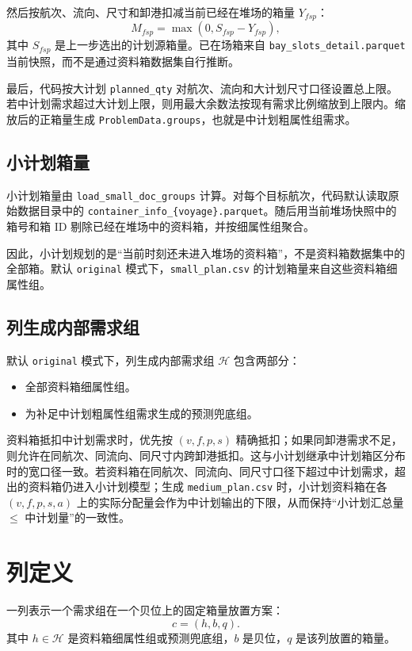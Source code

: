 \documentclass[UTF8,a4paper,11pt]{ctexart}
\newcommand{\code}[1]{\nolinkurl{#1}}
\begin{document}
然后按航次、流向、尺寸和卸港扣减当前已经在堆场的箱量 \(Y_{fsp}\)：
\[
M_{fsp}=\max(0, S_{fsp}-Y_{fsp}),
\]
其中 \(S_{fsp}\) 是上一步选出的计划源箱量。已在场箱来自 \code{bay_slots_detail.parquet} 当前快照，而不是通过资料箱数据集自行推断。

最后，代码按大计划 \code{planned_qty} 对航次、流向和大计划尺寸口径设置总上限。若中计划需求超过大计划上限，则用最大余数法按现有需求比例缩放到上限内。缩放后的正箱量生成 \code{ProblemData.groups}，也就是中计划粗属性组需求。

\subsection{小计划箱量}

小计划箱量由 \code{load_small_doc_groups} 计算。对每个目标航次，代码默认读取原始数据目录中的 \code{container_info_\{voyage\}.parquet}。随后用当前堆场快照中的箱号和箱 ID 剔除已经在堆场中的资料箱，并按细属性组聚合。

因此，小计划规划的是“当前时刻还未进入堆场的资料箱”，不是资料箱数据集中的全部箱。默认 \code{original} 模式下，\code{small_plan.csv} 的计划箱量来自这些资料箱细属性组。

\subsection{列生成内部需求组}

默认 \code{original} 模式下，列生成内部需求组 \(\mathcal{H}\) 包含两部分：
\begin{itemize}
  \item 全部资料箱细属性组。
  \item 为补足中计划粗属性组需求生成的预测兜底组。
\end{itemize}

资料箱抵扣中计划需求时，优先按 \((v,f,p,s)\) 精确抵扣；如果同卸港需求不足，则允许在同航次、同流向、同尺寸内跨卸港抵扣。这与小计划继承中计划箱区分布时的宽口径一致。若资料箱在同航次、同流向、同尺寸口径下超过中计划需求，超出的资料箱仍进入小计划模型；生成 \code{medium_plan.csv} 时，小计划资料箱在各 \((v,f,p,s,a)\) 上的实际分配量会作为中计划输出的下限，从而保持“小计划汇总量 \(\le\) 中计划量”的一致性。

\section{列定义}

一列表示一个需求组在一个贝位上的固定箱量放置方案：
\[
c=(h,b,q).
\]
其中 \(h\in\mathcal{H}\) 是资料箱细属性组或预测兜底组，\(b\) 是贝位，\(q\) 是该列放置的箱量。
\end{document}
